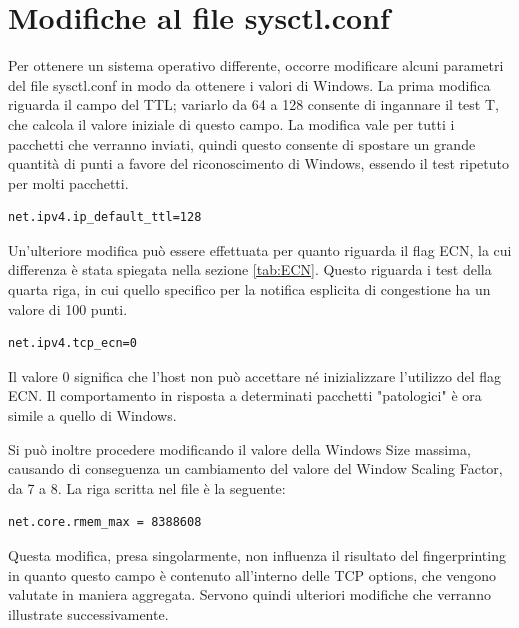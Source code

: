 \section{Modifiche al file sysctl.conf}
Per ottenere un sistema operativo differente, occorre modificare alcuni parametri del file sysctl.conf in modo da ottenere i valori di Windows.
La prima modifica riguarda il campo del TTL; variarlo da 64 a 128 consente di ingannare il test T, che calcola il valore iniziale di questo campo. La modifica vale per tutti i pacchetti che verranno inviati, quindi questo consente di spostare un grande quantità di punti a favore del riconoscimento di Windows, essendo il test ripetuto per molti pacchetti.

\begin{lstlisting}[caption={Modifica al campo TTL nel file sysctl.conf}, label=listing_ttl]
	net.ipv4.ip_default_ttl=128
\end{lstlisting}

Un'ulteriore modifica può essere effettuata per quanto riguarda il flag ECN, la cui differenza è stata spiegata nella sezione \ref{tab:ECN}. Questo riguarda i test della quarta riga, in cui quello specifico per la notifica esplicita di congestione ha un valore di 100 punti.

\begin{lstlisting}[caption={Modifica al campo ECN nel file sysctl.conf}]
	net.ipv4.tcp_ecn=0
\end{lstlisting} 

Il valore 0 significa che l'host non può accettare né inizializzare l'utilizzo del flag ECN. Il comportamento in risposta a determinati pacchetti "patologici" è ora simile a quello di Windows.

Si può inoltre procedere modificando il valore della Windows Size massima, causando di conseguenza un cambiamento del valore del Window Scaling Factor, da 7 a 8. 
La riga scritta nel file è la seguente:

\begin{lstlisting}[caption={Modifica alla Windows Size massima nel file sysctl.conf}, label=listingscaling]
	net.core.rmem_max = 8388608
\end{lstlisting}

Questa modifica, presa singolarmente, non influenza il risultato del fingerprinting in quanto questo campo è contenuto all'interno delle TCP options, che vengono valutate in maniera aggregata. Servono quindi ulteriori modifiche che verranno illustrate successivamente.


